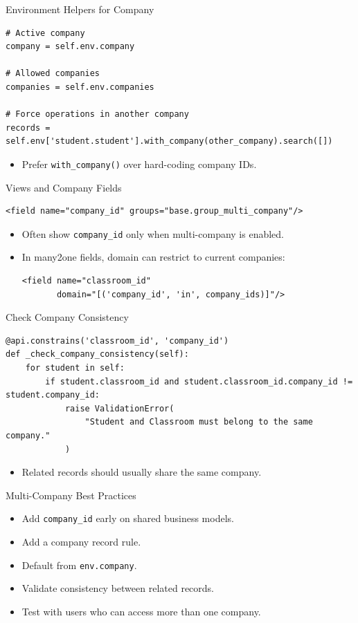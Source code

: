 \begin{frame}[fragile]{Environment Helpers for Company}
\begin{lstlisting}
# Active company
company = self.env.company

# Allowed companies
companies = self.env.companies

# Force operations in another company
records = self.env['student.student'].with_company(other_company).search([])
\end{lstlisting}
	\begin{itemize}
		\item Prefer \texttt{with\_company()} over hard-coding company IDs.
	\end{itemize}
\end{frame}

\begin{frame}[fragile]{Views and Company Fields}
\begin{lstlisting}[style=xml]
<field name="company_id" groups="base.group_multi_company"/>
\end{lstlisting}
	\begin{itemize}
		\item Often show \texttt{company\_id} only when multi-company is enabled.
		\item In many2one fields, domain can restrict to current companies:
\begin{lstlisting}[style=xml]
<field name="classroom_id"
	   domain="[('company_id', 'in', company_ids)]"/>
\end{lstlisting}
	\end{itemize}
\end{frame}

\begin{frame}[fragile]{Check Company Consistency}
\begin{lstlisting}
@api.constrains('classroom_id', 'company_id')
def _check_company_consistency(self):
	for student in self:
		if student.classroom_id and student.classroom_id.company_id != student.company_id:
			raise ValidationError(
				"Student and Classroom must belong to the same company."
			)
\end{lstlisting}
	\begin{itemize}
		\item Related records should usually share the same company.
	\end{itemize}
\end{frame}

\begin{frame}{Multi-Company Best Practices}
	\begin{itemize}
		\item Add \texttt{company\_id} early on shared business models.
		\item Add a company record rule.
		\item Default from \texttt{env.company}.
		\item Validate consistency between related records.
		\item Test with users who can access more than one company.
	\end{itemize}
\end{frame}
